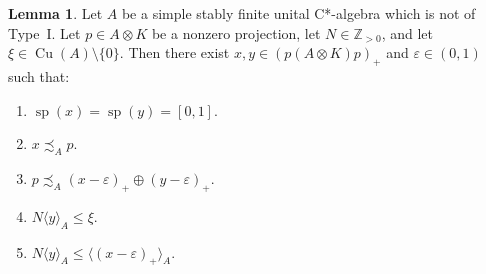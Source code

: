 \documentclass[10pt]{amsart}
\numberwithin{equation}{section}
\theoremstyle{definition}
\newtheorem{lem}[thm]{Lemma}
\newcommand{\ep}{\varepsilon}
\newcommand{\N}{{\mathbb{Z}}_{> 0}}
\newcommand{\spec}{{\operatorname{sp}}}
\newcommand{\Cu}{{\operatorname{Cu}}}
\newcommand{\ca}{C*-algebra}
\newcommand{\nzp}{nonzero projection}
\newcommand{\cc}[1]{\langle #1 \rangle}
\begin{document}
\begin{lem}\label{L_5Z26_InterpPj}
Let $A$ be a simple stably finite unital \ca{} which is not of
Type~I.
Let $p \in A \otimes K$ be a \nzp,
let $N \in \N$,
and let $\xi \in \Cu (A) \setminus \{ 0 \}$.
Then there exist $x, y \in (p (A \otimes K) p)_{+}$ and
$\ep \in (0, 1)$ such that:
%
\begin{enumerate}
%
\item\label{I_L_5Z26_InnPj_Spec}
$\spec (x) = \spec (y) = [0, 1]$.
%
\item\label{I_L_5Z26_InnPj_xlp}
$x \precsim_A p$.
%
\item\label{I_L_5Z26_InnPj_plxy}
$p \precsim_A (x - \ep)_{+} \oplus (y - \ep)_{+}$.
%
\item\label{I_L_5Z26_InnPj_nylxi}
$N \cc{y}_A \leq \xi$.
%
\item\label{I_L_5Z26_InnPj_NyLeBe}
$N \cc{y}_A \leq \cc{(x - \ep)_{+}}_A$.
%
\end{enumerate}
%
\end{lem}
\end{document}
